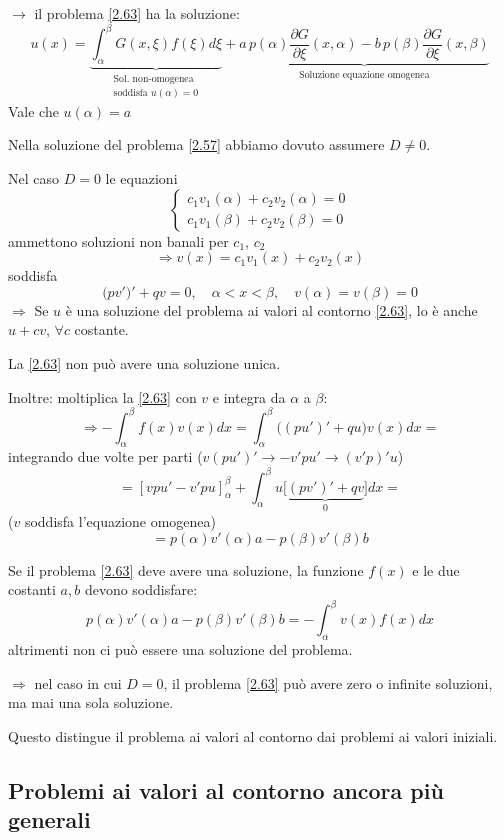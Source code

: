 \documentclass[a4paper,11pt]{report}
\begin{document}
$\rightarrow$ il problema \eqref{2.63} ha la soluzione:
\begin{equation}
u(x)=\underbrace{\int_\alpha^\beta G(x,\xi)f(\xi)d\xi}_{\substack{\text{Sol. non-omogenea}\\ \text{soddisfa $u(\alpha)=0$}}} + \underbrace{a\,p(\alpha)\frac{\partial G}{\partial \xi}(x,\alpha)-b\,p(\beta)\frac{\partial G}{\partial \xi}(x,\beta)}_\text{Soluzione equazione omogenea}
\end{equation}
Vale che $u(\alpha)=a$

Nella soluzione del problema \eqref{2.57} abbiamo dovuto assumere $D\neq 0$.

Nel caso $D=0$ le equazioni
\[
\begin{cases}
c_1v_1(\alpha)+c_2v_2(\alpha)=0\\
c_1v_1(\beta)+c_2 v_2(\beta)=0
\end{cases}
\]
ammettono soluzioni non banali per $c_1$, $c_2$
\[
\Rightarrow v(x)=c_1v_1(x) + c_2 v_2(x)
\]
soddisfa
\[
\big(pv'\big)'+qv=0, \quad \alpha<x<\beta, \quad v(\alpha)=v(\beta)=0
\]
$\Rightarrow$ Se $u$ \`e una soluzione del problema ai valori al contorno \eqref{2.63}, lo \`e anche $u+cv$, $\forall c$ costante.

La \eqref{2.63} non pu\`o avere una soluzione unica.

Inoltre: moltiplica la \eqref{2.63} con $v$ e integra da $\alpha$ a $ \beta$:
\[
\Rightarrow-\int_\alpha^\beta f(x)v(x)dx=\int_\alpha^\beta \big((pu')' + qu\big) v(x) dx=
\]
integrando due volte per parti ($v(pu')' \rightarrow -v'pu' \rightarrow (v'p)'u$)
\[
=\left[vpu' - v'pu\right]_\alpha^\beta+\int_\alpha^\beta u \big[ \underbrace{(pv')'+qv}_{0} \big] dx=
\]
($v$ soddisfa l'equazione omogenea)
\[
=p(\alpha)v'(\alpha)a-p(\beta)v'(\beta)b
\]

Se il problema \eqref{2.63} deve avere una soluzione, la funzione $f(x)$ e le due costanti $a,b$ devono soddisfare:
\[
p(\alpha)v'(\alpha)a-p(\beta)v'(\beta)b=-\int_\alpha^\beta v(x)f(x)dx
\]
altrimenti non ci pu\`o essere una soluzione del problema.

$\Rightarrow$ nel caso in cui $D=0$, il problema \eqref{2.63} pu\`o avere zero o infinite soluzioni, ma mai una sola soluzione.

Questo distingue il problema ai valori al contorno dai problemi ai valori iniziali.

\subsection{Problemi ai valori al contorno ancora pi\`u generali}
\end{document}
